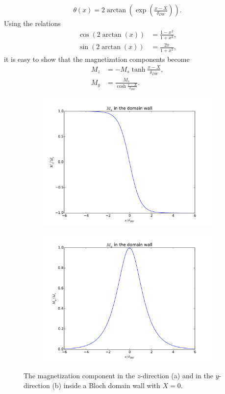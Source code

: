 \documentclass[12pt, a4paper]{article}		%
\numberwithin{equation}{section}
\begin{document}
\begin{align}
\label{eq:thetaBloch}
\theta(x) = 2\arctan(\exp(\frac{x-X}{\delta_{DW}})).
\end{align}
Using the relations
\begin{align*}
\cos(2\arctan(x)) &= \frac{1-x^2}{1+x^2}, \\
\sin(2\arctan(x)) &= \frac{2x}{1+x^2},
\end{align*}
it is easy to show that the magnetization components become
\begin{align}
M_z &= - M_s\tanh\frac{x-X}{\delta_{DW}}, \label{eq:BlochMagZ} \\
M_y &= \frac{M_s}{\cosh\frac{x-X}{\delta_{DW}}}.
\end{align}
\begin{figure}[h!]
\centering
\begin{subfigure}{.5\textwidth}
  \centering
  \includegraphics[width=1.0\linewidth]{Figures/BlochWallMz}
  \caption{}
\end{subfigure}%
\begin{subfigure}{.5\textwidth}
  \centering
  \includegraphics[width=1.0\linewidth]{Figures/BlochWallMy}
  \caption{}
\end{subfigure}
\caption{The magnetization component in the $z$-direction (a) and in the $y$-direction (b) inside a Bloch domain wall with $X = 0$.}
\label{fig:BlochWall}
\end{figure}
\end{document}
